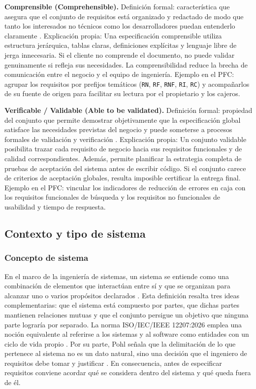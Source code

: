 \documentclass[onecolumn,12pt,a4paper]{IEEEtran}
\begin{document}
	\textbf{Comprensible (Comprehensible).} Definici\'on formal: caracter\'istica que asegura que el conjunto de requisitos est\'a organizado y redactado de modo que tanto los interesados no t\'ecnicos como los desarrolladores puedan entenderlo claramente \cite{iso29148,pohl2025}. Explicaci\'on propia: Una especificaci\'on comprensible utiliza estructura jer\'arquica, tablas claras, definiciones expl\'icitas y lenguaje libre de jerga innecesaria. Si el cliente no comprende el documento, no puede validar genuinamente si refleja sus necesidades. La comprensibilidad reduce la brecha de comunicaci\'on entre el negocio y el equipo de ingenier\'ia. Ejemplo en el PFC: agrupar los requisitos por prefijos tem\'aticos (\texttt{RN}, \texttt{RF}, \texttt{RNF}, \texttt{RI}, \texttt{RC}) y acompa\~narlos de su fuente de origen para facilitar su lectura por el propietario y los cajeros.

	\textbf{Verificable / Validable (Able to be validated).} Definici\'on formal: propiedad del conjunto que permite demostrar objetivamente que la especificaci\'on global satisface las necesidades previstas del negocio y puede someterse a procesos formales de validaci\'on y verificaci\'on \cite{iso29148,swebok4}. Explicaci\'on propia: Un conjunto validable posibilita trazar cada requisito de negocio hacia sus requisitos funcionales y de calidad correspondientes. Adem\'as, permite planificar la estrategia completa de pruebas de aceptaci\'on del sistema antes de escribir c\'odigo. Si el conjunto carece de criterios de aceptaci\'on globales, resulta imposible certificar la entrega final. Ejemplo en el PFC: vincular los indicadores de reducci\'on de errores en caja con los requisitos funcionales de b\'usqueda y los requisitos no funcionales de usabilidad y tiempo de respuesta.

\subsection{Contexto y tipo de sistema}

\subsubsection{Concepto de sistema}
En el marco de la ingenier\'ia de sistemas, un sistema se entiende como una combinaci\'on de elementos que interact\'uan entre s\'i y que se organizan para alcanzar uno o varios prop\'ositos declarados \cite{iso15288}. Esta definici\'on resalta tres ideas complementarias: que el sistema est\'a compuesto por partes, que dichas partes mantienen relaciones mutuas y que el conjunto persigue un objetivo que ninguna parte lograr\'ia por separado. La norma ISO/IEC/IEEE 12207:2026 emplea una noci\'on equivalente al referirse a los sistemas y al software como entidades con un ciclo de vida propio \cite{iso12207}. Por su parte, Pohl se\~nala que la delimitaci\'on de lo que pertenece al sistema no es un dato natural, sino una decisi\'on que el ingeniero de requisitos debe tomar y justificar \cite{pohl2025}. En consecuencia, antes de especificar requisitos conviene acordar qu\'e se considera dentro del sistema y qu\'e queda fuera de \'el.
\end{document}
